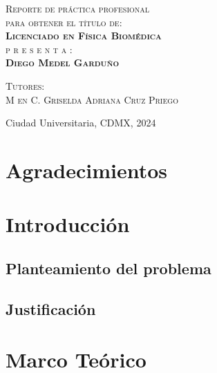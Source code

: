 \documentclass[letterpaper,12pt,oneside]{book}
\begin{document}
\begin{titlepage}
\begin{minipage}[c][0.81\textheight][t]{0.75\textwidth}
\begin{center}
                \vspace{2cm}            

                \textsc{\large Reporte de práctica profesional}\\[0.5cm]
                \textsc{\large para obtener el t\'itulo de:}\\[1.5cm]
                \textbf{\textsc{\Large Licenciado en Física Biomédica}}\\[2 cm]
                \textsc{\Large p r e s e n t a :}\\[0.5cm]
                \textbf{\textsc{\large {Diego Medel Garduño}}}\\[2cm]          

                \vspace{0.5cm}

                {\large\scshape Tutores:\\[0.3cm] {M en C. Griselda Adriana Cruz Priego}}\\[.2in]

                \vspace{0.5cm}

                \large{Ciudad Universitaria, CDMX,}{ }{2024}
            \end{center}
        \end{minipage}
    \end{titlepage}

    \frontmatter
    \chapter{Agradecimientos}

    \newpage

    \tableofcontents
    \mainmatter

    \chapter{Introducción}
    \section{Planteamiento del problema}
    \section{Justificación}
    

    

    \chapter{Marco Teórico}
    
\end{document}

